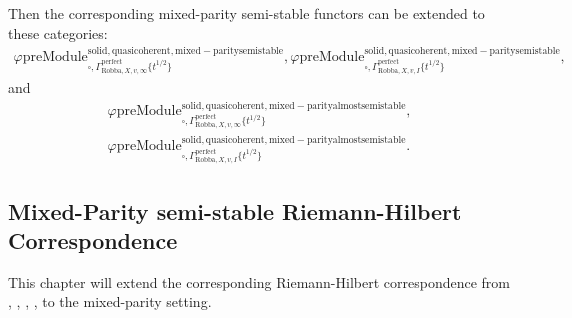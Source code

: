 \documentclass[12pt]{book}
\theoremstyle{definition}
\begin{document}
\indent Then the corresponding mixed-parity semi-stable functors can be extended to these categories:
\begin{align}
\varphi\mathrm{preModule}^\mathrm{solid,quasicoherent,mixed-paritysemistable}_{\square,\Gamma^\mathrm{perfect}_{\text{Robba},X,v,\infty}\{t^{1/2}\}},
\varphi\mathrm{preModule}^\mathrm{solid,quasicoherent,mixed-paritysemistable}_{\square,\Gamma^\mathrm{perfect}_{\text{Robba},X,v,I}\{t^{1/2}\}}, 
\end{align}
and
\begin{align}
\varphi\mathrm{preModule}^\mathrm{solid,quasicoherent,mixed-parityalmostsemistable}_{\square,\Gamma^\mathrm{perfect}_{\text{Robba},X,v,\infty}\{t^{1/2}\}},\\
\varphi\mathrm{preModule}^\mathrm{solid,quasicoherent,mixed-parityalmostsemistable}_{\square,\Gamma^\mathrm{perfect}_{\text{Robba},X,v,I}\{t^{1/2}\}}. 
\end{align}


\subsection{Mixed-Parity semi-stable Riemann-Hilbert Correspondence}


\indent This chapter will extend the corresponding Riemann-Hilbert correspondence from \cite{Sch1}, \cite{LZ}, \cite{BL1}, \cite{BL2}, \cite{M} to the mixed-parity setting.
\end{document}
